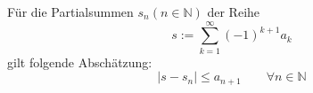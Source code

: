 Für die Partialsummen $s_n (n \in \mathbb{N})$ der Reihe
$$s := \sum_{k=1}^\infty (-1)^{k+1} a_k$$
gilt folgende Abschätzung:
$$|s - s_n| \leq a_{n+1} \qquad \forall n \in \mathbb{N}$$